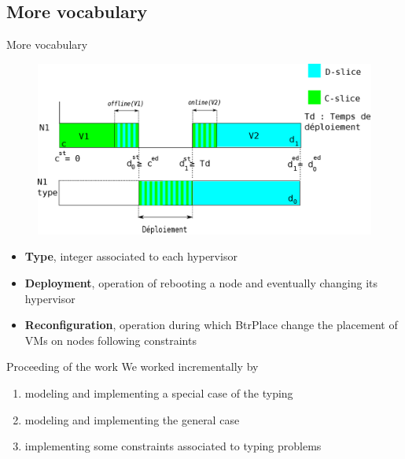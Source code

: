 \documentclass{beamer}
\begin{document}
\subsection{More vocabulary}
\begin{frame}{More vocabulary}
\begin{figure}[!ht]
	\centering
	\includegraphics[scale=.4]{imgs/config.eps}
\end{figure}
\begin{itemize}
	\item{\textbf{Type}}, integer associated to each hypervisor
	\item{\textbf{Deployment}}, operation of rebooting a node and
		eventually changing its hypervisor
	\item{\textbf{Reconfiguration}}, operation during which BtrPlace
		change the placement of VMs on nodes following constraints
\end{itemize}
\end{frame}
\begin{frame}{Proceeding of the work}
We worked incrementally by
\begin{enumerate}
	 \item modeling and implementing a special case of the typing
	 \item modeling and implementing the general case
	 \item implementing some constraints associated to typing problems
\end{enumerate}
\end{frame}
\end{document}
